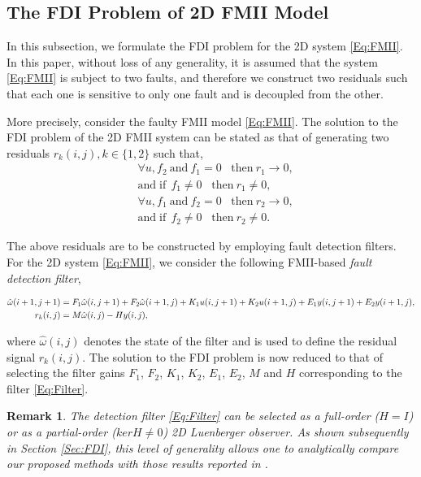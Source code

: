 \documentclass[journal,12pt,draftcls,onecolumn]{IEEEtran}
\newcommand{\bs}{\begin{small}}
\newcommand{\es}{\end{small}}
\def\QEDclosed{\hfill\IEEEQEDclosed}
\renewcommand{\qed}{\QEDclosed}
\newtheorem{remark}{Remark}
\begin{document}
\subsection{The FDI  Problem of 2D FMII Model}\label{Sec:FDIProb}
In this subsection,  we formulate the FDI problem for the 2D system \eqref{Eq:FMII}. In this paper, without loss of any generality, it is assumed that the system \eqref{Eq:FMII} is subject to two faults, and therefore we construct two residuals such that each one is sensitive to only one fault and is decoupled from the other.

More precisely, consider the faulty FMII model \eqref{Eq:FMII}. The solution to the FDI problem of the 2D FMII system can be stated as that of generating two residuals $r_k(i,j), k\in\{1,2\}$ such that,
\begin{subequations}\label{Eq:FDIP}
	\begin{align}
		&\forall u , f_2 \  \mathrm{and} \ f_1=0 \;\;\; \mathrm{then} \  r_1\rightarrow 0 \nonumber, \\ &\mathrm{and}\;\mathrm{if} \ \ f_1\neq 0 \;\;\; \mathrm{then} \ r_1\neq  0  \label{FDI_InObs1},\\
		&\forall u,  f_1  \  \mathrm{and} \ f_2=0 \;\;\; \mathrm{then} \  r_2\rightarrow 0 \nonumber, \\ &\mathrm{and}\;\mathrm{if} \ \ f_2\neq 0 \;\;\; \mathrm{then} \ r_2\neq  0 \label{FDI_InObs2}.
	\end{align}
\end{subequations}


The above residuals are to be constructed by employing fault detection filters. For the 2D system
\eqref{Eq:FMII}, we consider the following FMII-based {\it fault detection filter},
\bs
\begin{align}\label{Eq:Filter}
	\hat{\omega}(i+1,j+1) &= F_1\hat{\omega}(i,j+1) + F_2\hat{\omega}(i+1,j)+ K_1u(i,j+1) + K_2u(i+1,j) + E_1y(i,j+1) + E_2y(i+1,j),\notag\\
	r_k(i,j) &= M\hat{\omega}(i,j)-Hy(i,j),
\end{align}
\es
where $\hat{\omega}(i,j)$ denotes the state of the filter and is used to define the residual signal $r_k(i,j)$. The solution to the FDI problem is now reduced to that of selecting the filter gains $F_1$, $F_2$, $K_1$, $K_2$, $E_1$, $E_2$, $M$ and $H$ corresponding to the filter \eqref{Eq:Filter}.
\begin{remark}\label{Rem:GeneralFilter}
	The detection filter \eqref{Eq:Filter} can be selected as a full-order ($H=I$) or as a partial-order ($ker H\neq 0$) 2D Luenberger observer.
As shown subsequently in Section \ref{Sec:FDI}, this level of generality allows one to analytically compare our proposed methods with those results reported in \cite{Malek_3DFDI}.\qed
\end{remark}
\end{document}
